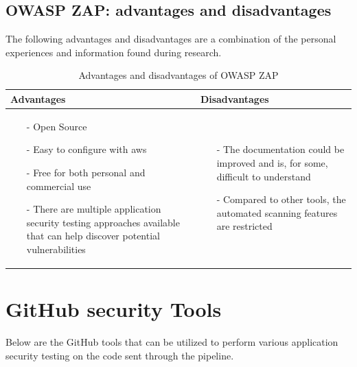 \subsection{OWASP ZAP: advantages and disadvantages}
The following advantages and disadvantages are a combination of the personal experiences and information found during research.\cite{prosconsZAP}
\begin{table}[H]
    \begin{threeparttable}
        \begin{tabular}{|>{\raggedright\arraybackslash}p{6cm}|>{\raggedright\arraybackslash}p{6cm}|}
            \hline
            \textbf{Advantages} & \textbf{Disadvantages} \\
            \hline
            \begin{itemize}
                \item [-]Open Source
                \item [-]Easy to configure with \acrshort{aws}
                \item [-]Free for both personal and commercial use
                \item [-]There are multiple application security testing approaches available that can help discover potential vulnerabilities
            \end{itemize}
            &
            \begin{itemize}
                \item [-] The documentation could be improved and is, for some, difficult to understand
                \item [-]Compared to other tools, the automated scanning features are restricted
            \end{itemize}
            \\
            \hline
        \end{tabular}
            \caption{Advantages and disadvantages of OWASP ZAP}
    \end{threeparttable}
\end{table}


\section{GitHub security Tools}
Below are the GitHub tools that can be utilized to perform various application security testing on the code sent through the pipeline. 
